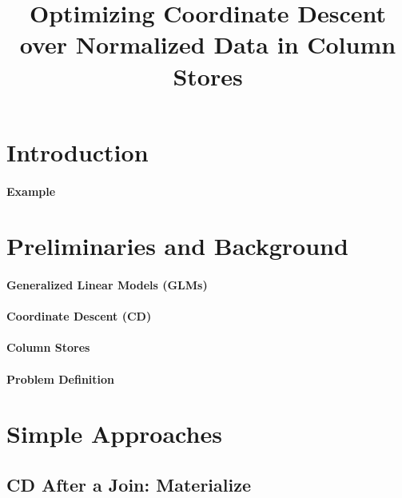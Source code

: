 \documentclass{vldb}
\begin{document}
\title{Optimizing Coordinate Descent over Normalized Data in Column Stores}

\maketitle

\begin{abstract}

\end{abstract}


\section{Introduction}

\paragraph*{Example}



\section{Preliminaries and Background}

\paragraph*{Generalized Linear Models (GLMs)}

\paragraph*{Coordinate Descent (CD)}

\paragraph*{Column Stores}

\paragraph*{Problem Definition}



\section{Simple Approaches}

\subsection{CD After a Join: Materialize}
\end{document}
